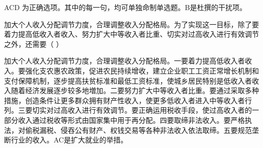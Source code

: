 \begin{solution}ACD 为正确选项。其中的每一句，均可单独命制单选题。B是杜撰的干扰项。
\end{solution}
\question 加大个人收入分配调节力度，合理调整收入分配格局。为了实现这一目标，除了要着力提高低收入者收入、努力扩大中等收入者比重、切实对过高收入进行有效调节之外，还需要（
）
\par{}
\begin{solution}加大个人收入分配调节力度，合理调整收入分配格局。一要着力提高低收入者收入。要强化支农惠农政策，促进农民持续增收，建立企业职工工资正常增长机制和支付保障机制，逐步提高扶贫标准和最低工资标准，使城乡居民特别是低收入者收入随着经济发展逐步较多地増加。二要努力扩大中等收入者比重。要通过采取多种措施，创造条件让更多群众拥有财产性收入，使更多低收入者进入中等收入者行列。三要切实对过高收入进行有效调节。要正确运用税收手段，使过高收入者的一部分收入通过税收等形式由国家集中用于再分配。四要取缔非法收入。要严格执法，对偷税漏税、侵吞公有财产、权钱交易等各种非法收入依法取缔。五要规范垄断行业的收入。AC是扩大就业的举措。
\end{solution}
